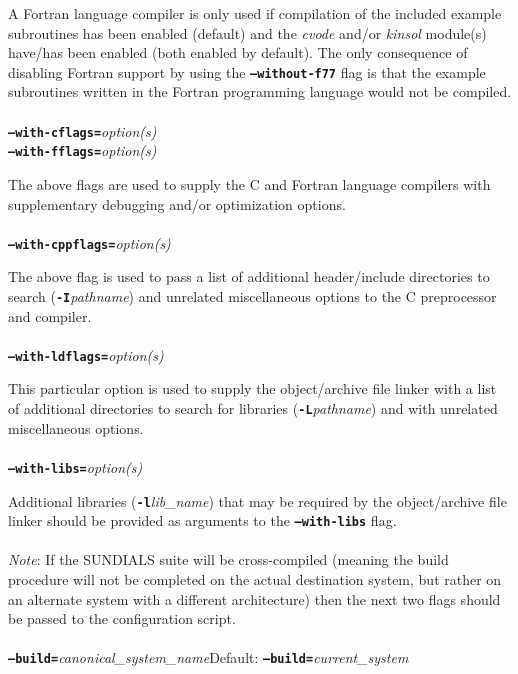 A Fortran language compiler is only used if compilation of the included example subroutines has been enabled (default) and the \textit{cvode} and/or \textit{kinsol} module(s) have/has been enabled (both enabled by default).   The only consequence of disabling Fortran support by using the \texttt{\textbf{--without-f77}} flag is that the example subroutines written in the Fortran programming language would not be compiled.
\\
\\
\texttt{\textbf{--with-cflags=}}\textit{option(s)}\\
\texttt{\textbf{--with-fflags=}}\textit{option(s)}\vspace{0.05in}

The above flags are used to supply the C and Fortran language compilers with supplementary debugging and/or optimization options.
\\
\\
\texttt{\textbf{--with-cppflags=}}\textit{option(s)}\vspace{0.05in}

The above flag is used to pass a list of additional header/include directories to search (\texttt{\textbf{-I}}\textit{pathname}) and unrelated miscellaneous options to the C preprocessor and compiler. 
\\
\\
\texttt{\textbf{--with-ldflags=}}\textit{option(s)}\vspace{0.05in}

This particular option is used to supply the object/archive file linker with a list of additional directories to search for libraries (\texttt{\textbf{-L}}\textit{pathname}) and with unrelated miscellaneous options.
\\
\\
\texttt{\textbf{--with-libs=}}\textit{option(s)}\vspace{0.05in}

Additional libraries (\texttt{\textbf{-l}}\textit{lib\_name}) that may be required by the object/archive file linker should be provided as arguments to the \texttt{\textbf{--with-libs}} flag.
\\
\\ \enlargethispage*{1ex}
\textit{Note}: If the \small SUNDIALS \normalsize suite will be cross-compiled (meaning the build procedure will not be completed on the actual destination system, but rather on an alternate system with a different architecture) then the next two flags should be passed to the configuration script.
\\
\\
\texttt{\textbf{--build=}}\textit{canonical\_system\_name}\hspace{0.5in}Default: \texttt{\textbf{--build=}}\textit{current\_system}\vspace{0.05in}

